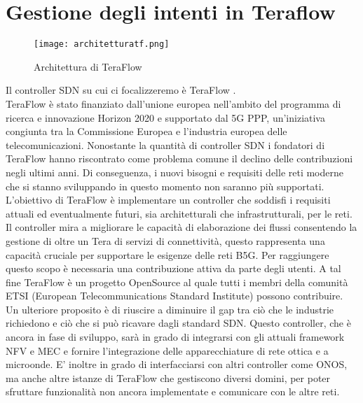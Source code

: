 \chapter{Gestione degli intenti in Teraflow}
\label{cap:teraflow}
\begin{figure}[h]
    \centering
   \texttt{[image: architetturatf.png]}
    \caption{Architettura di TeraFlow \cite{archtfs}}
    \label{fig:tfs}
\end{figure}
Il controller SDN su cui ci focalizzeremo è TeraFlow \cite{TeraFlow}. 
\\TeraFlow è stato finanziato dall'unione europea nell'ambito del programma di ricerca e innovazione Horizon 2020\cite{Horizon} e supportato dal 5G PPP\cite{5GPPP}, un'iniziativa congiunta tra la Commissione Europea e l'industria europea delle telecomunicazioni.
Nonostante la quantità di controller SDN i fondatori di TeraFlow hanno riscontrato come problema comune il declino delle contribuzioni negli ultimi anni. 
Di conseguenza, i nuovi bisogni e requisiti delle reti moderne che si stanno sviluppando in questo momento non saranno più supportati.
\\L'obiettivo di TeraFlow è implementare un controller che soddisfi i requisiti attuali ed eventualmente futuri, sia architetturali che infrastrutturali, per le reti.
Il controller mira a migliorare le capacità di elaborazione dei flussi consentendo la gestione di oltre un Tera di servizi di connettività, questo rappresenta una capacità cruciale per supportare le esigenze delle reti B5G. 
Per raggiungere questo scopo è necessaria una contribuzione attiva 
da parte degli utenti. A tal fine TeraFlow è un progetto OpenSource 
al quale tutti i membri della comunità ETSI (European Telecommunications Standard Institute) \cite{etsi} possono contribuire. 
\\Un ulteriore proposito è di riuscire a diminuire il gap tra ciò che le industrie richiedono e ciò che si può ricavare dagli standard SDN.
Questo controller, che è ancora in fase di sviluppo, sarà in grado di integrarsi con gli attuali framework NFV e MEC e fornire l'integrazione delle 
apparecchiature di rete ottica e a microonde. E' inoltre in grado di interfacciarsi con altri controller come ONOS, ma anche altre istanze di TeraFlow che gestiscono diversi domini, per poter sfruttare funzionalità non ancora implementate e comunicare con le altre reti.
